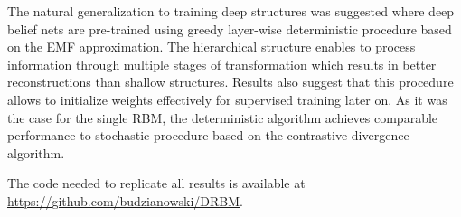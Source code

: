The natural generalization to training deep structures was suggested where deep belief nets are pre-trained using greedy layer-wise deterministic procedure based on the EMF approximation. The hierarchical structure enables to process information through multiple stages of transformation which results in better reconstructions than shallow structures. Results also suggest that this procedure allows to initialize weights effectively for supervised training later on. As it was the case for the single RBM, the deterministic algorithm achieves comparable performance to stochastic procedure based on the contrastive divergence algorithm.

The code needed to replicate all results is available at \url{https://github.com/budzianowski/DRBM}. 

